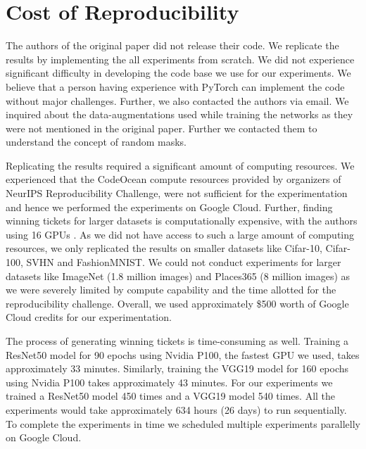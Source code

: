     
    
    
    
    
    
    \section{Cost of Reproducibility}
    \label{sec:cost}
    The authors of the original paper \cite{repro_paper} did not release their code. We replicate the results by implementing the all experiments from scratch. We did not experience significant difficulty in developing the code base we use for our experiments. We believe that a person having experience with PyTorch  can implement the code without major challenges. Further, we also contacted the authors via email. We inquired about the data-augmentations used while training the networks as they were not mentioned in the original paper. Further we contacted them to understand the concept of random masks. 
    
    Replicating the results required a significant amount of computing resources. We experienced that the CodeOcean compute resources provided by organizers of NeurIPS Reproducibility Challenge,  were not sufficient for the experimentation and hence we performed the experiments on Google Cloud. Further, finding winning tickets for larger datasets is computationally expensive, with the authors using 16 GPUs \cite{repro_paper}. As we did not have access to such a large amount of computing resources, we only replicated the results on smaller datasets like Cifar-10, Cifar-100, SVHN and FashionMNIST. We could not conduct experiments for larger datasets like ImageNet (1.8 million images) \cite{imagenet} and Places365 (8 million images) \cite{places365} as we were severely limited by compute capability and the time allotted for the reproducibility challenge. Overall, we used  approximately \$500 worth of Google Cloud credits for our experimentation.
    
    The process of generating winning tickets is time-consuming as well. Training a ResNet50 model for 90 epochs using Nvidia P100, the fastest GPU we used, takes approximately 33 minutes. Similarly, training the VGG19 model for 160 epochs using Nvidia P100 takes approximately 43 minutes. For our experiments we trained a ResNet50 model 450 times and a VGG19 model 540 times. All the experiments would take approximately 634 hours (26 days) to run sequentially. To complete the experiments in time we scheduled multiple experiments parallelly on Google Cloud.  
    

